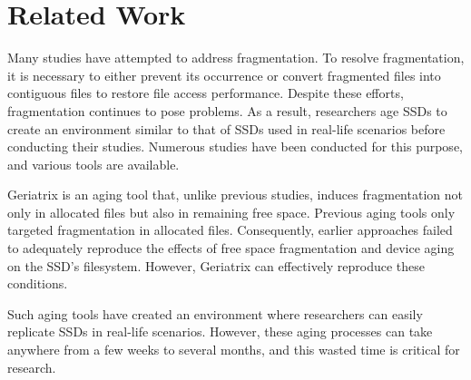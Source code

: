 \section{Related Work}
\label{s:related}

Many studies have attempted to address fragmentation.
To resolve fragmentation, it is necessary to either prevent its occurrence or convert fragmented files into contiguous files to restore file access performance.
Despite these efforts, fragmentation continues to pose problems. As a result, researchers age SSDs to create an environment similar to that of SSDs used in real-life scenarios before conducting their studies.
Numerous studies have been conducted for this purpose, and various tools are available.


Geriatrix\cite{geriatrix:atc18} is an aging tool that, unlike previous studies, induces fragmentation not only in allocated files but also in remaining free space.
Previous aging tools only targeted fragmentation in allocated files.
Consequently, earlier approaches failed to adequately reproduce the effects of free space fragmentation and device aging on the SSD's filesystem.
However, Geriatrix can effectively reproduce these conditions.

Such aging tools have created an environment where researchers can easily replicate SSDs in real-life scenarios.
However, these aging processes can take anywhere from a few weeks to several months, and this wasted time is critical for research.
